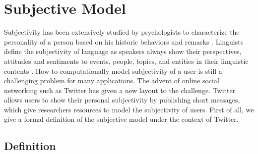 \documentclass[letterpaper]{article}
\begin{document}
\section{Subjective Model}
\label{subjectivemodel}

Subjectivity has been extensively studied by psychologists to characterize the personality of a person based on his historic behaviors and remarks \cite{Engbert2007}. 
Linguists define the subjectivity of language as speakers always show their perspectives, attitudes and sentiments to events, people, topics, and entities in their linguistic contents \cite{stein2005subjectivity}. 
How to computationally model subjectivity of a user is still a challenging problem for many applications. 
The advent of online social networking such as Twitter has given a new layout to the challenge.  
Twitter allows users to show their personal subjectivity by publishing short messages, which give researchers resources to model the subjectivity of users.
First of all, we give a formal definition of the subjective model under the context of Twitter.

\subsection{Definition}
\label{definition}
\end{document}
